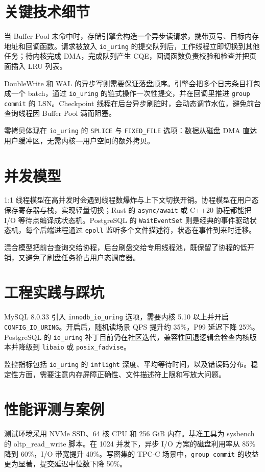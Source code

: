 \chapter{关键技术细节}
当 Buffer Pool 未命中时，存储引擎会构造一个异步读请求，携带页号、目标内存地址和回调函数。请求被放入 \texttt{io\_{}uring} 的提交队列后，工作线程立即切换到其他任务；待内核完成 DMA，完成队列产生 CQE，回调函数负责校验和检查并把页面插入 LRU 列表。\par
DoubleWrite 和 WAL 的异步写则需要保证落盘顺序。引擎会把多个日志条目打包成一个 batch，通过 \texttt{io\_{}uring} 的链式操作一次性提交，并在回调里推进 \texttt{group commit} 的 LSN。Checkpoint 线程在后台异步刷脏时，会动态调节水位，避免前台查询线程因 Buffer Pool 满而阻塞。\par
零拷贝体现在 \texttt{io\_{}uring} 的 \texttt{SPLICE} 与 \texttt{FIXED\_{}FILE} 选项：数据从磁盘 DMA 直达用户缓冲区，无需内核—用户空间的额外拷贝。\par
\chapter{并发模型}
1:1 线程模型在高并发时会遇到线程数爆炸与上下文切换开销。协程模型在用户态保存寄存器与栈，实现轻量切换；Rust 的 \texttt{async/await} 或 C++20 协程都能把 I/O 等待点编译成状态机。PostgreSQL 的 \texttt{WaitEventSet} 则是经典的事件驱动状态机，每个后端进程通过 \texttt{epoll} 监听多个文件描述符，状态在事件到来时迁移。\par
混合模型把前台查询交给协程，后台刷盘交给专用线程池，既保留了协程的低开销，又避免了刷盘任务抢占用户态调度器。\par
\chapter{工程实践与踩坑}
MySQL 8.0.33 引入 \texttt{innodb\_{}io\_{}uring} 选项，需要内核 5.10 以上并开启 \texttt{CONFIG\_{}IO\_{}URING}。开启后，随机读场景 QPS 提升约 35\%{}，P99 延迟下降 25\%{}。PostgreSQL 的 \texttt{io\_{}uring} 补丁目前仍在社区迭代，兼容性回退逻辑会检查内核版本并降级到 \texttt{libaio} 或 \texttt{posix\_{}fadvise}。\par
监控指标包括 \texttt{io\_{}uring} 的 \texttt{inflight} 深度、平均等待时间，以及错误码分布。稳定性方面，需要注意内存屏障正确性、文件描述符上限和写放大问题。\par
\chapter{性能评测与案例}
测试环境采用 NVMe SSD、64 核 CPU 和 256 GiB 内存。基准工具为 sysbench 的 oltp\_{}read\_{}write 脚本。在 1024 并发下，异步 I/O 方案的磁盘利用率从 85\%{} 降到 60\%{}，I/O 带宽提升 40\%{}。写密集的 TPC-C 场景中，\texttt{group commit} 的收益更为显著，提交延迟中位数下降 50\%{}。\par
